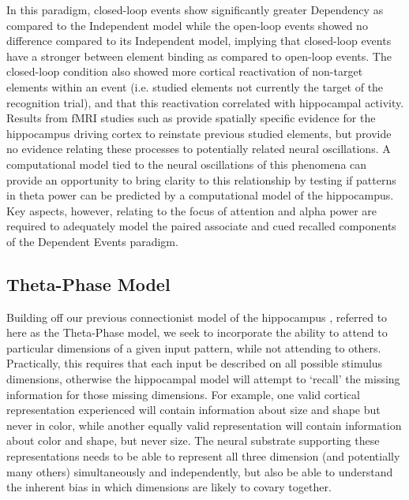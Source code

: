 \documentclass[11pt, titlepage, twoside]{article}
\begin{document}
In this paradigm, closed-loop events show significantly greater Dependency as compared to the Independent model while the open-loop events showed no difference compared to its Independent model, implying that closed-loop events have a stronger between element binding as compared to open-loop events.  The closed-loop condition also showed more cortical reactivation of non-target elements within an event (i.e. studied elements not currently the target of the recognition trial), and that this reactivation correlated with hippocampal activity.  Results from fMRI studies such as \textcite{HornerBisbyBushEtAl15} provide spatially specific evidence for the hippocampus driving cortex to reinstate previous studied elements, but provide no evidence relating these processes to potentially related neural oscillations.  A computational model tied to the neural oscillations of this phenomena can provide an opportunity to bring clarity to this relationship by testing if patterns in theta power can be predicted by a computational model of the hippocampus.  Key aspects, however, relating to the focus of attention and alpha power are required to adequately model the paired associate and cued recalled components of the Dependent Events paradigm.



\subsection{Theta-Phase Model}

Building off our previous connectionist model of the hippocampus \cite{KetzMorkondaOReilly13}, referred to here as the Theta-Phase model, we seek to incorporate the ability to attend to particular dimensions of a given input pattern, while not attending to others.  Practically, this requires that each input be described on all possible stimulus dimensions, otherwise the hippocampal model will attempt to `recall' the missing information for those missing dimensions.  For example, one valid cortical representation experienced will contain information about size and shape but never in color, while another equally valid representation will contain information about color and shape, but never size.  The neural substrate supporting these representations needs to be able to represent all three dimension (and potentially many others) simultaneously and independently, but also be able to understand the inherent bias in which dimensions are likely to covary together.  
\end{document}
